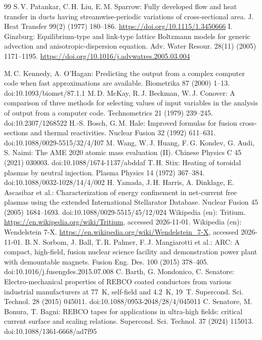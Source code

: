\documentclass[10pt,a4paper]{article}
\begin{document}
\begin{thebibliography}{99}
 S.\,V. Patankar, C.\,H. Liu, E.\,M. Sparrow: Fully developed flow and heat transfer in ducts having streamwise-periodic variations of cross-sectional area. J. Heat Transfer 99(2) (1977) 180--186. \url{https://doi.org/10.1115/1.3450666}
 I. Ginzburg: Equilibrium-type and link-type lattice Boltzmann models for generic advection and anisotropic-dispersion equation. Adv. Water Resour. 28(11) (2005) 1171--1195. \url{https://doi.org/10.1016/j.advwatres.2005.03.004}

 M.\,C. Kennedy, A. O'Hagan: Predicting the output from a complex computer code when fast
  approximations are available. Biometrika 87 (2000) 1--13. doi:10.1093/biomet/87.1.1
 M.\,D. McKay, R.\,J. Beckman, W.\,J. Conover: A comparison of three methods for selecting values
  of input variables in the analysis of output from a computer code. Technometrics 21 (1979) 239--245. doi:10.2307/1268522
 H.-S. Bosch, G.\,M. Hale: Improved formulas for fusion cross-sections and thermal
  reactivities. Nuclear Fusion 32 (1992) 611--631. doi:10.1088/0029-5515/32/4/I07
 M. Wang, W.\,J. Huang, F.\,G. Kondev, G. Audi, S. Naimi: The AME 2020 atomic mass evaluation (II).
  Chinese Physics C 45 (2021) 030003. doi:10.1088/1674-1137/abddaf
 T.\,H. Stix: Heating of toroidal plasmas by neutral injection. Plasma Physics 14 (1972) 367--384.
  doi:10.1088/0032-1028/14/4/002
 H. Yamada, J.\,H. Harris, A. Dinklage, E. Ascasibar et al.: Characterization of energy confinement
  in net-current free plasmas using the extended International Stellarator Database. Nuclear Fusion 45 (2005)
  1684--1693. doi:10.1088/0029-5515/45/12/024
 Wikipedia (en): Tritium. \url{https://en.wikipedia.org/wiki/Tritium}, accessed 2026-11-01.
 Wikipedia (en): Wendelstein 7-X. \url{https://en.wikipedia.org/wiki/Wendelstein_7-X}, accessed 2026-11-01.
 B.\,N. Sorbom, J. Ball, T.\,R. Palmer, F.\,J. Mangiarotti et al.: ARC: A compact, high-field, fusion nuclear science facility and demonstration power plant with demountable magnets. Fusion Eng. Des. 100 (2015) 378--405. doi:10.1016/j.fusengdes.2015.07.008
 C. Barth, G. Mondonico, C. Senatore: Electro-mechanical properties of REBCO coated conductors from various industrial manufacturers at 77~K, self-field and 4.2~K, 19~T. Supercond. Sci. Technol. 28 (2015) 045011. doi:10.1088/0953-2048/28/4/045011
 C. Senatore, M. Bonura, T. Bagni: REBCO tapes for applications in ultra-high fields: critical current surface and scaling relations. Supercond. Sci. Technol. 37 (2024) 115013. doi:10.1088/1361-6668/ad7f95

\end{thebibliography}
\end{document}
